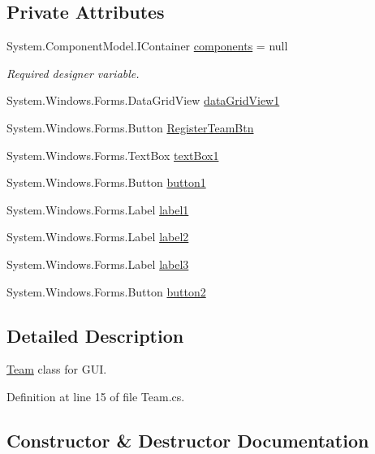 \subsection*{Private Attributes}
\begin{DoxyCompactItemize}
\item 
System.\+Component\+Model.\+I\+Container \hyperlink{classPCO_1_1TeamForm_a47238abc2ea85680c65c8b757df90735}{components} = null
\begin{DoxyCompactList}\small\item\em Required designer variable. \end{DoxyCompactList}\item 
System.\+Windows.\+Forms.\+Data\+Grid\+View \hyperlink{classPCO_1_1TeamForm_acafac5199c10afdd517a2a55f4b69d56}{data\+Grid\+View1}
\item 
System.\+Windows.\+Forms.\+Button \hyperlink{classPCO_1_1TeamForm_a0f3183f1f7a617f73ad921e563232099}{Register\+Team\+Btn}
\item 
System.\+Windows.\+Forms.\+Text\+Box \hyperlink{classPCO_1_1TeamForm_a77f8816df21a9f10e4ab566113233033}{text\+Box1}
\item 
System.\+Windows.\+Forms.\+Button \hyperlink{classPCO_1_1TeamForm_acabbe33eb1239f30a81e936b9db3f44b}{button1}
\item 
System.\+Windows.\+Forms.\+Label \hyperlink{classPCO_1_1TeamForm_a634d907c5d6a0db9663987c84376a042}{label1}
\item 
System.\+Windows.\+Forms.\+Label \hyperlink{classPCO_1_1TeamForm_afcf78574df7b1257a7b1f9122ff1d929}{label2}
\item 
System.\+Windows.\+Forms.\+Label \hyperlink{classPCO_1_1TeamForm_ac1175e060b42b00c8a1d2e40688cdcbf}{label3}
\item 
System.\+Windows.\+Forms.\+Button \hyperlink{classPCO_1_1TeamForm_af82fb831d677b35db6f42b87dcb05a92}{button2}
\end{DoxyCompactItemize}


\subsection{Detailed Description}
\hyperlink{classTeam}{Team} class for G\+UI. 

Definition at line 15 of file Team.\+cs.



\subsection{Constructor \& Destructor Documentation}
\mbox{\label{classPCO_1_1TeamForm_ae73d439729559ea44c8912d6b9d29fa0}} 
